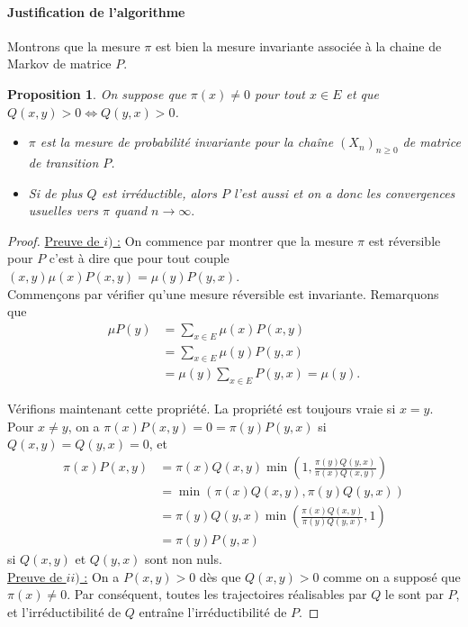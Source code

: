 \documentclass[a4paper,12pt]{book}
\newtheorem{propfr}[thmfr]{Proposition}
\begin{document}
\paragraph{Justification de l'algorithme}
Montrons que la mesure $\pi$ est bien la mesure invariante associée à la chaine de Markov de matrice $P$.
\begin{propfr}On suppose que $\pi(x)\neq 0$ pour tout $x\in E$ et que $Q(x,y)>0 \Leftrightarrow Q(y,x)>0$.
\begin{itemize}
\item[$i)$] $\pi$ est la mesure de probabilité invariante pour la chaîne $(X_n)_{n\geq 0}$ de matrice de transition $P$.
\item[$ii)$] Si de plus $Q$ est irréductible, alors $P$ l'est aussi et on a donc les convergences usuelles vers $\pi$ quand $n\to \infty.$
\end{itemize}
\end{propfr}
\begin{proof}
\underline{Preuve de $i)$ :} On commence par montrer que la mesure $\pi$ est réversible pour $P$ c'est à dire que pour tout couple  $(x,y) \mu(x)P(x,y)=\mu(y)P(y,x)$.\\
Commençons par vérifier qu'une mesure réversible est invariante. Remarquons que
\begin{align*}
\mu P (y)&= \sum_{x\in E} \mu(x)P(x,y)\\
&=\sum_{x\in E} \mu(y) P(y,x)\\
&= \mu(y)\sum_{x\in E} P(y,x)=\mu(y).
\end{align*}

Vérifions maintenant cette propriété.
La propriété est toujours vraie si $x=y$.\\
Pour $x\neq y$, on a
$\pi(x)P(x,y)=0=\pi(y)P(y,x)$ si $Q(x,y)=Q(y,x)=0$, et
\begin{align*}
\pi(x)P(x,y)&=\pi(x)Q(x,y) \min\left(1,\frac{\pi(y)Q(y,x)}{\pi(x)Q(x,y)}\right)\\
&= \min\left(\pi(x)Q(x,y),\pi(y)Q(y,x)\right)\\
&=\pi(y)Q(y,x) \min\left(\frac{\pi(x)Q(x,y)}{\pi(y)Q(y,x)},1\right)\\
&=\pi(y)P(y,x)
\end{align*}
si $Q(x,y)$ et $Q(y,x)$ sont non nuls.\\

\underline{Preuve de $ii)$ :} On a $P(x,y)>0$ dès que $Q(x,y)>0$ comme on a supposé que $\pi(x)\neq 0$. Par conséquent, toutes les trajectoires réalisables par $Q$ le sont par $P$, et l'irréductibilité de $Q$ entraîne l'irréductibilité de $P$.

\end{proof}
\end{document}
